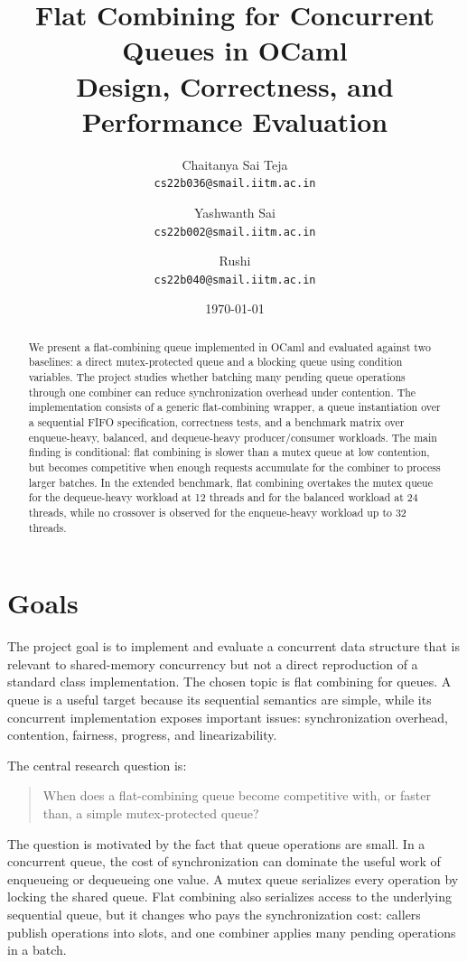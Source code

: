 \documentclass[11pt,a4paper]{article}
\title{Flat Combining for Concurrent Queues in OCaml\\[0.3em]
\large Design, Correctness, and Performance Evaluation}
\author{
  Chaitanya Sai Teja \\ \texttt{cs22b036@smail.iitm.ac.in}
  \and
  Yashwanth Sai \\ \texttt{cs22b002@smail.iitm.ac.in}
  \and
  Rushi \\ \texttt{cs22b040@smail.iitm.ac.in}
}
\date{\today}
\begin{document}
\maketitle

\begin{abstract}
We present a flat-combining queue implemented in OCaml and evaluated against two baselines: a direct mutex-protected queue and a blocking queue using condition variables. The project studies whether batching many pending queue operations through one combiner can reduce synchronization overhead under contention. The implementation consists of a generic flat-combining wrapper, a queue instantiation over a sequential FIFO specification, correctness tests, and a benchmark matrix over enqueue-heavy, balanced, and dequeue-heavy producer/consumer workloads. The main finding is conditional: flat combining is slower than a mutex queue at low contention, but becomes competitive when enough requests accumulate for the combiner to process larger batches. In the extended benchmark, flat combining overtakes the mutex queue for the dequeue-heavy workload at 12 threads and for the balanced workload at 24 threads, while no crossover is observed for the enqueue-heavy workload up to 32 threads.
\end{abstract}

\section{Goals}
The project goal is to implement and evaluate a concurrent data structure that is relevant to shared-memory concurrency but not a direct reproduction of a standard class implementation. The chosen topic is flat combining for queues. A queue is a useful target because its sequential semantics are simple, while its concurrent implementation exposes important issues: synchronization overhead, contention, fairness, progress, and linearizability.

The central research question is:

\begin{quote}
When does a flat-combining queue become competitive with, or faster than, a simple mutex-protected queue?
\end{quote}

The question is motivated by the fact that queue operations are small. In a concurrent queue, the cost of synchronization can dominate the useful work of enqueueing or dequeueing one value. A mutex queue serializes every operation by locking the shared queue. Flat combining also serializes access to the underlying sequential queue, but it changes who pays the synchronization cost: callers publish operations into slots, and one combiner applies many pending operations in a batch.
\end{document}

